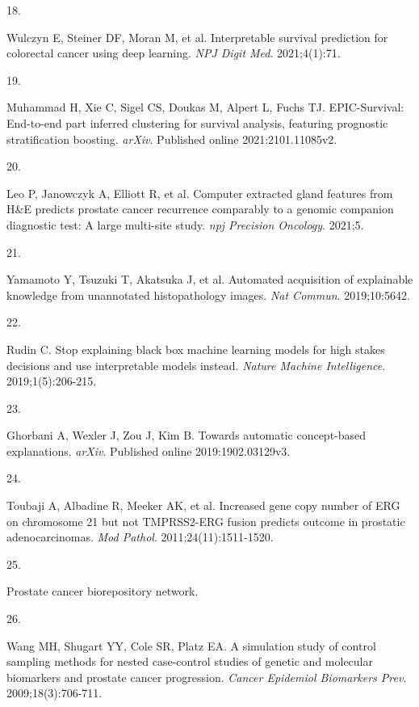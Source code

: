\documentclass[
  12pt,
  a5,margin=2cmpaper,
]{article}
\newlength{\cslhangindent}
\newlength{\csllabelwidth}
\newlength{\cslentryspacingunit} %
\newenvironment{CSLReferences}[2] %
 {%
  \setlength{\parindent}{0pt}
  \ifodd #1
  \let\oldpar\par
  \def\par{\hangindent=\cslhangindent\oldpar}
  \fi
  \setlength{\parskip}{#2\cslentryspacingunit}
 }%
 {}
\newcommand{\CSLLeftMargin}[1]{\parbox[t]{\csllabelwidth}{#1}}
\newcommand{\CSLRightInline}[1]{\parbox[t]{\linewidth - \csllabelwidth}{#1}\break}
\begin{document}
\begin{CSLReferences}{0}{0}
\leavevmode{}%
\CSLLeftMargin{18. }%
\CSLRightInline{Wulczyn E, Steiner DF, Moran M, et al. Interpretable
survival prediction for colorectal cancer using deep learning. \emph{NPJ
Digit Med}. 2021;4(1):71.}

\leavevmode{}%
\CSLLeftMargin{19. }%
\CSLRightInline{Muhammad H, Xie C, Sigel CS, Doukas M, Alpert L, Fuchs
TJ. {EPIC-Survival}: End-to-end part inferred clustering for survival
analysis, featuring prognostic stratification boosting. \emph{arXiv}.
Published online 2021:2101.11085v2.}

\leavevmode{}%
\CSLLeftMargin{20. }%
\CSLRightInline{Leo P, Janowczyk A, Elliott R, et al. Computer extracted
gland features from {H\&E} predicts prostate cancer recurrence
comparably to a genomic companion diagnostic test: A large multi-site
study. \emph{npj Precision Oncology}. 2021;5.}

\leavevmode{}%
\CSLLeftMargin{21. }%
\CSLRightInline{Yamamoto Y, Tsuzuki T, Akatsuka J, et al. Automated
acquisition of explainable knowledge from unannotated histopathology
images. \emph{Nat Commun}. 2019;10:5642.}

\leavevmode{}%
\CSLLeftMargin{22. }%
\CSLRightInline{Rudin C. Stop explaining black box machine learning
models for high stakes decisions and use interpretable models instead.
\emph{Nature Machine Intelligence}. 2019;1(5):206-215.}

\leavevmode{}%
\CSLLeftMargin{23. }%
\CSLRightInline{Ghorbani A, Wexler J, Zou J, Kim B. Towards automatic
concept-based explanations. \emph{arXiv}. Published online
2019:1902.03129v3.}

\leavevmode{}%
\CSLLeftMargin{24. }%
\CSLRightInline{Toubaji A, Albadine R, Meeker AK, et al. Increased gene
copy number of {ERG} on chromosome 21 but not {TMPRSS2-ERG} fusion
predicts outcome in prostatic adenocarcinomas. \emph{Mod Pathol}.
2011;24(11):1511-1520.}

\leavevmode{}%
\CSLLeftMargin{25. }%
\CSLRightInline{Prostate cancer biorepository network.}

\leavevmode{}%
\CSLLeftMargin{26. }%
\CSLRightInline{Wang MH, Shugart YY, Cole SR, Platz EA. A simulation
study of control sampling methods for nested case-control studies of
genetic and molecular biomarkers and prostate cancer progression.
\emph{Cancer Epidemiol Biomarkers Prev}. 2009;18(3):706-711.}


\end{CSLReferences}
\end{document}
